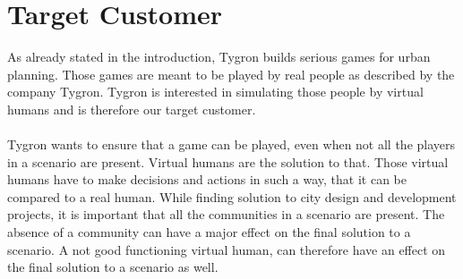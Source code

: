 \section{Target Customer}
As already stated in the introduction, Tygron builds serious games for urban planning. Those games are meant to be played by real people as described by the company Tygron\cite{tygron}. Tygron is interested in simulating those people by virtual humans and is therefore our target customer.\\
\\
Tygron wants to ensure that a game can be played, even when not all the players in a scenario are present. Virtual humans are the solution to that. Those virtual humans have to make decisions and actions in such a way, that it can be compared to a real human. While finding solution to city design and development projects, it is important that all the communities in a scenario are present. The absence of a community can have a major effect on the final solution to a scenario. A not good functioning virtual human, can therefore have an effect on the final solution to a scenario as well. 